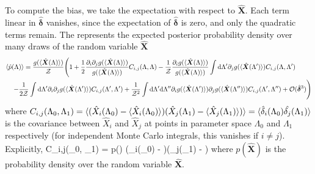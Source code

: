 \documentclass[%
 reprint,
 amsmath,amssymb,
 aps,nofootinbib,nobibnotes,onecolumn,prd
]{revtex4-2}
\begin{document}
To compute the bias, we take the expectation with respect to $\hat{\bm X}$. Each term linear in $\hat{\bm \delta}$ vanishes, since the expectation of $\hat{\bm \delta}$ is zero, and only the quadratic terms remain. The represents the expected posterior probability density over many draws of the random variable $\hat{\bm X}$
\begin{align}
\langle \hat{p}(\Lambda&)\rangle = \frac{
g(\langle \hat{\bm X}(\Lambda)\rangle)
}{
\mathcal{Z}
}
\Bigg(
1 
+ 
\frac{1}{2}\frac{\partial_i\partial_jg(\langle \hat{\bm X}(\Lambda)\rangle)}{g(\langle \hat{\bm X}(\Lambda)\rangle)}C_{i,j}(\Lambda, \Lambda)
- 
\frac{1}{\mathcal{Z}}\frac{\partial_ig(\langle \hat{\bm X}(\Lambda)\rangle)}{g(\langle \hat{\bm X}(\Lambda)\rangle)} \int {\rm d}\Lambda'\partial_jg(\langle \hat{\bm X}(\Lambda')\rangle)C_{i,j}(\Lambda, \Lambda') \nonumber \\
- &\frac{1}{2\mathcal{Z}}\int {\rm d}\Lambda' \partial_i\partial_jg(\langle \hat{\bm X}(\Lambda')\rangle)C_{i,j}(\Lambda', \Lambda')
+
\frac{1}{\mathcal{Z}^2}\int {\rm d}\Lambda' {\rm d}\Lambda'' \partial_i g(\langle \hat{\bm X}(\Lambda')\rangle)\partial_j g(\langle \hat{\bm X}(\Lambda'')\rangle)C_{i,j}(\Lambda', \Lambda'')+ \mathcal{O}(\hat{\bm \delta}^3)
\Bigg)
\label{eq: full bias}
\end{align}
where $C_{i,j}(\Lambda_0, \Lambda_1) = \langle (\hat{X}_i(\Lambda_0) - \langle \hat{X}_i(\Lambda_0)\rangle)(\hat{X}_j(\Lambda_1) - \langle \hat{X}_j(\Lambda_1)\rangle)\rangle =  \langle \hat{\delta}_i(\Lambda_0)\hat{\delta_j}(\Lambda_1)\rangle$ is the covariance between $\hat{X}_i$ and $\hat{X}_j$ at points in parameter space $\Lambda_0$ and $\Lambda_1$ respectively (for independent Monte Carlo integrals, this vanishes if $i\neq j$). Explicitly, 
\beq
C_{i,j}(\Lambda_0, \Lambda_1) =  p() \left(_i(\Lambda_0) - \right)\left(_j(\Lambda_1) - \right)
\label{eq: covariance of single MC integral}
\eeq
where $p(\hat{\bm X})$ is the probability density over the random variable $\hat{\bm X}$. 
\end{document}
